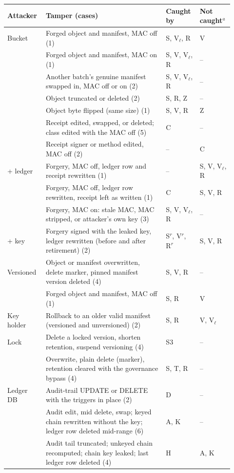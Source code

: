 
\begin{tabular}{@{}p{0.14\linewidth}p{0.5\linewidth}p{0.14\linewidth}p{0.14\linewidth}@{}}
\toprule
Attacker & Tamper (cases) & Caught by & Not caught$^a$ \\
\midrule
Bucket & Forged object and manifest, MAC off (1) & S, V$_\ell$, R & V \\
 & Forged object and manifest, MAC on (1) & S, V, V$_\ell$, R & -- \\
 & Another batch's genuine manifest swapped in, MAC off or on (2) & S, V, V$_\ell$, R & -- \\
 & Object truncated or deleted (2) & S, R, Z & -- \\
 & Object byte flipped (same size) (1) & S, V, R & Z \\
 & Receipt edited, swapped, or deleted; class edited with the MAC off (5) & C & -- \\
 & Receipt signer or method edited, MAC off (2) & -- & C \\
\addlinespace[1pt]
+ ledger & Forgery, MAC off, ledger row and receipt rewritten (1) & -- & S, V, V$_\ell$, R \\
 & Forgery, MAC off, ledger row rewritten, receipt left as written (1) & C & S, V, R \\
 & Forgery, MAC on: stale MAC, MAC stripped, or attacker's own key (3) & S, V, V$_\ell$, R & -- \\
\addlinespace[1pt]
+ key & Forgery signed with the leaked key, ledger rewritten (before and after retirement) (2) & S$^r$, V$^r$, R$^r$ & S, V, R \\
\addlinespace[1pt]
Versioned & Object or manifest overwritten, delete marker, pinned manifest version deleted (4) & S, V, R & -- \\
 & Forged object and manifest, MAC off (1) & S, R & V \\
\addlinespace[1pt]
Key holder & Rollback to an older valid manifest (versioned and unversioned) (2) & S, R & V, V$_\ell$ \\
\addlinespace[1pt]
Lock & Delete a locked version, shorten retention, suspend versioning (4) & S3 & -- \\
 & Overwrite, plain delete (marker), retention cleared with the governance bypass (4) & S, T, R & -- \\
\addlinespace[1pt]
Ledger DB & Audit-trail UPDATE or DELETE with the triggers in place (2) & D & -- \\
 & Audit edit, mid delete, swap; keyed chain rewritten without the key; ledger row deleted mid-range (6) & A, K & -- \\
 & Audit tail truncated; unkeyed chain recomputed; chain key leaked; last ledger row deleted (4) & H & A, K \\
\bottomrule
\end{tabular}
